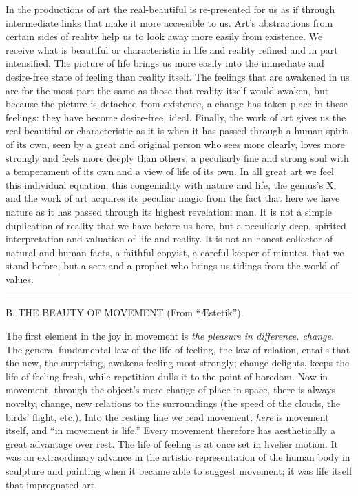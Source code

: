\documentclass[12pt,a4paper,openany]{book}
\newcommand{\opage}[1]{\marginnote{\footnotesize\textit{[#1]}}}
\newcommand{\excerpthead}[1]{\par\bigskip\begin{center}#1\end{center}\nopagebreak\smallskip}
\newcommand{\sectionrule}{\par\begin{center}\rule{4em}{0.4pt}\end{center}}
\begin{document}
In the productions of art the real-beautiful is re-presented
for us as if through intermediate links that make it more
accessible to us. Art's abstractions from certain sides of reality
help us to look away more easily from existence. We
receive what is beautiful or characteristic in life and reality
refined and in part intensified. The picture of life brings us more easily
into the immediate and desire-free state of feeling than reality
itself. The feelings that are awakened in us are for the most part
the same as those that reality itself would awaken, but
because the picture is detached from existence, a change
has taken place in these feelings: they have become desire-free,
ideal. Finally, the work of art gives us the real-beautiful or
characteristic as it is when it has passed through
a human spirit of its own, seen by a great and original
person who sees more clearly, loves more strongly and feels more deeply
than others, a peculiarly fine and strong soul with a temperament
of its own and a view of life of its own. In all great art we feel this
individual equation, this congeniality with nature and
life, the genius's X, and the work of art acquires its peculiar
magic from the fact that here we have nature as it has passed
\setcounter{footnote}{0}%
\opage{267}through its highest revelation: man. It is not a
simple duplication of reality that we have before us here, but
a peculiarly deep, spirited interpretation and valuation of
life and reality. It is not an honest collector of natural
and human facts, a faithful copyist, a careful
keeper of minutes, that we stand before, but a seer and a prophet
who brings us tidings from the world of values.

\sectionrule

\excerpthead{B. THE BEAUTY OF MOVEMENT (From ``Æstetik'').}


The first element in the joy in movement is \emph{the pleasure
in difference, change}. The general
fundamental law of the life of feeling, the law of relation, entails that the new,
the surprising, awakens feeling most strongly; change delights,
keeps the life of feeling fresh, while repetition dulls it
to the point of boredom. Now in movement, through the object's
mere change of place in space, there is always novelty, change,
new relations to the surroundings (the speed of the clouds, the birds'
flight, etc.). Into the resting line we read movement;
\emph{here} is movement itself, and ``in movement is life.''
Every movement therefore has aesthetically a great advantage over rest.
The life of feeling is at once set in livelier motion. It was
an extraordinary advance in the artistic representation
of the human body in sculpture and painting when it became able
to suggest movement; it was life itself that impregnated
art.
\end{document}
